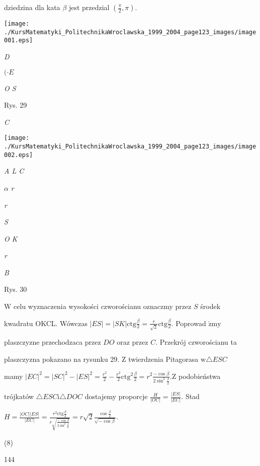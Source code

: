 \documentclass[a4paper,12pt]{article}
\begin{document}
dziedzina dla kata $\beta$ jest przedzial $(\displaystyle \frac{\pi}{2},\pi).$
\begin{center}
\texttt{[image: ./KursMatematyki\_PolitechnikaWroclawska\_1999\_2004\_page123\_images/image001.eps]}
\end{center}
{\it D}

$(\cdot E$

{\it O S}

Rys. 29

{\it C}
\begin{center}
\texttt{[image: ./KursMatematyki\_PolitechnikaWroclawska\_1999\_2004\_page123\_images/image002.eps]}
\end{center}
{\it A  L C}

$\alpha$  {\it r}

{\it r}

{\it S}

{\it O K}

{\it r}

{\it B}

Rys. 30

$\mathrm{W}$ celu wyznaczenia wysokości czworościanu oznaczmy przez $S$ środek

kwadratu OKCL. Wówczas $|ES|= |SK|\displaystyle \mathrm{c}\mathrm{t}\mathrm{g}\frac{\beta}{2}=\frac{r}{\sqrt{2}}\mathrm{c}\mathrm{t}\mathrm{g}\frac{\beta}{2}.$ Poprowad $\acute{\mathrm{z}}\mathrm{m}\mathrm{y}$

plaszczyzne przechodzaca przez $DO$ oraz przez $C$. Przekrój czworościanu ta

plaszczyzna pokazano na rysunku 29. $\mathrm{Z}$ twierdzenia Pitagorasa $\mathrm{w}\triangle ESC$

mamy $|EC|^{2}=|SC|^{2}-|ES|^{2}=\displaystyle \frac{r^{2}}{2}-\frac{r^{2}}{2}\mathrm{c}\mathrm{t}\mathrm{g}^{2}\frac{\beta}{2}=r^{2}\frac{-\cos\beta}{2\sin^{2}\frac{\beta}{2}}. \mathrm{Z}$ podobieństwa

trójkatów $\triangle ESC\mathrm{i}\triangle DOC$ dostajemy proporcje $\displaystyle \frac{H}{|OC|} = \displaystyle \frac{|ES|}{|EC|}$. Stad

$H=\displaystyle \frac{|OC||ES|}{|EC|}=\frac{r^{2}\mathrm{c}\mathrm{t}\mathrm{g}\frac{\beta}{2}}{r\sqrt{\frac{-\cos\beta}{2\sin^{2}\frac{\beta}{2}}}}=r\sqrt{2}\frac{\cos\frac{\beta}{2}}{\sqrt{-\cos\beta}}.$

(8)





144
\end{document}
